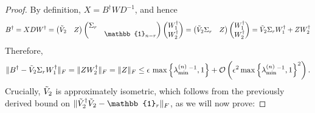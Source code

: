 \begin{proof}
By definition, $X=B^{\dag}WD^{-1}$, and hence
\begin{equation*}
B^{\dag}=XDW^{\dag} = 
\begin{pmatrix}
\Tilde{V}_2 & Z
\end{pmatrix}
\begin{pmatrix}
\Sigma_r &\\
& \mathbb{1}_{n-r}
\end{pmatrix}
\begin{pmatrix}
W_1^{\dag} \\ W_2^{\dag}
\end{pmatrix} = 
\begin{pmatrix}
\Tilde{V}_2 \Sigma_r & Z
\end{pmatrix}
\begin{pmatrix}
W_1^{\dag} \\ W_2^{\dag}
\end{pmatrix} = \Tilde{V}_2\Sigma_r W_1^{\dag} + ZW_2^{\dag}
\end{equation*}
Therefore,
\begin{equation*}
\|B^{\dag}-\Tilde{V}_2\Sigma_r W_1^{\dag}\|_F=\|ZW_2^{\dag}\|_F=\|Z\|_F\leq \epsilon\thinspace \operatorname{max}\left\{\lambda_{\text{min}}^{(n)}{}^{-1},1\right\}+\mathcal{O}\left(\epsilon^2\operatorname{max}\left\{\lambda_{\text{min}}^{(n)}{}^{-1},1\right\}^2\right).
\end{equation*}
Crucially, $\Tilde{V}_2$ is approximately isometric, which follows from the previously derived bound on $\|\Tilde{V}_2^{\dag}\Tilde{V}_2 -\mathbb{1}_r\|_F$, as we will now prove:


\end{proof}

